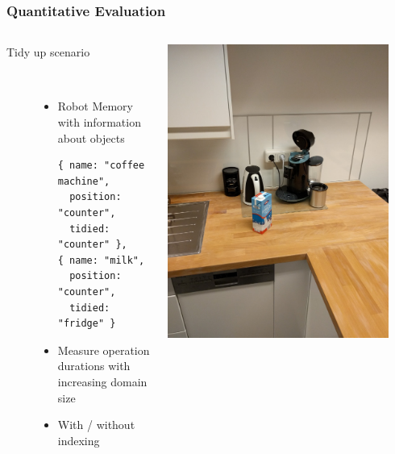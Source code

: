 \begin{frame}[fragile]
  \frametitle{Quantitative Evaluation}
  \begin{columns}
    \begin{column}{0.55\textwidth}
      \begin{description}
      \item[Tidy up scenario] \hfill \\
        \begin{itemize}
        \item Robot Memory with information about objects
          \begin{lstlisting}[style=SmallJSON,
            framexleftmargin=5pt, xleftmargin=0pt,
            morekeywords={}, numbers=none]
{ name: "coffee machine",
  position: "counter",
  tidied: "counter" },
{ name: "milk",
  position: "counter",
  tidied: "fridge" }
          \end{lstlisting}
        \item Measure operation durations with increasing domain size
        \item With / without indexing
        \end{itemize}
      \end{description}
    \end{column}
    \begin{column}{0.45\textwidth}
      \centering
    \includegraphics[width=0.9\textwidth]{../thesis/img/tidy-up}\\
    \end{column}
  \end{columns}
\end{frame}

